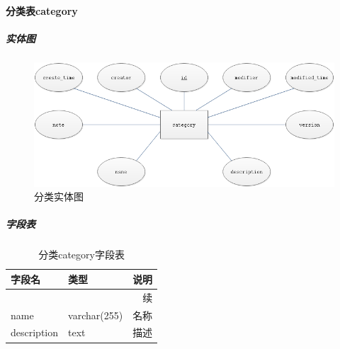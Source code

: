 \documentclass[titlepage,UTF8,linespread=1.5]{ctexart}
\begin{document}
\paragraph{分类表category}
\subparagraph{实体图}
\begin{figure}[H]
    \centering
    \includegraphics[width=140mm]{entity-category.png}
    \caption{分类实体图}
    \label{fig:entity-category}
\end{figure}
\subparagraph{字段表}
\begin{longtable}{|p{10em}|p{6em}|p{15em}|}
    \caption{分类category字段表}\label{tab:table_category} \\\hline
    字段名         & 类型         & 说明                   \\\hline
    \endfirsthead
    \multicolumn{3}{r}{{续\tablename\thetable{}}}          \\\hline
    \endhead
    name           & varchar(255) & 名称                   \\\hline
    description    & text         & 描述                   \\\hline
\end{longtable}\par
\end{document}
